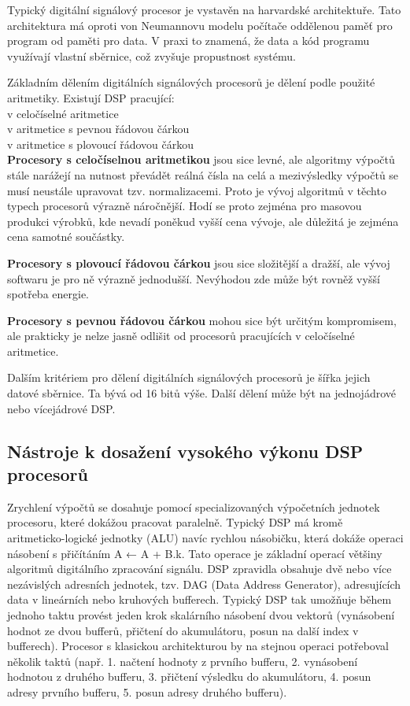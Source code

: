  Typický digitální signálový procesor je vystavěn na harvardské architektuře. Tato architektura má oproti von Neumannovu modelu počítače oddělenou paměť pro program od paměti pro data. V praxi to znamená, že data a kód programu využívají vlastní sběrnice, což zvyšuje propustnost systému.
 
Základním dělením digitálních signálových procesorů je dělení podle použité aritmetiky. Existují DSP pracující:\\
v celočíselné aritmetice\\
v aritmetice s pevnou řádovou čárkou\\
v aritmetice s plovoucí řádovou čárkou\\

\textbf{Procesory s celočíselnou aritmetikou} jsou sice levné, ale algoritmy výpočtů stále narážejí na nutnost převádět reálná čísla na celá a mezivýsledky výpočtů se musí neustále upravovat tzv. normalizacemi. Proto je vývoj algoritmů v těchto typech procesorů výrazně náročnější. Hodí se proto zejména pro masovou produkci výrobků, kde nevadí poněkud vyšší cena vývoje, ale důležitá je zejména cena samotné součástky.

\textbf{Procesory s plovoucí řádovou čárkou} jsou sice složitější a dražší, ale vývoj softwaru je pro ně výrazně jednodušší. Nevýhodou zde může být rovněž vyšší spotřeba energie.

\textbf{Procesory s pevnou řádovou čárkou} mohou sice být určitým kompromisem, ale prakticky je nelze jasně odlišit od procesorů pracujících v celočíselné aritmetice.

Dalším kritériem pro dělení digitálních signálových procesorů je šířka jejich datové sběrnice. Ta bývá od 16 bitů výše. Další dělení může být na jednojádrové nebo vícejádrové DSP. 

\subsection{Nástroje k dosažení vysokého výkonu DSP procesorů}
Zrychlení výpočtů se dosahuje pomocí specializovaných výpočetních jednotek procesoru, které dokážou pracovat paralelně. Typický DSP má kromě aritmeticko-logické jednotky (ALU) navíc rychlou násobičku, která dokáže operaci násobení s přičítáním A ← A + B.k. Tato operace je základní operací většiny algoritmů digitálního zpracování signálu. DSP zpravidla obsahuje dvě nebo více nezávislých adresních jednotek, tzv. DAG (Data Address Generator), adresujících data v lineárních nebo kruhových bufferech. Typický DSP tak umožňuje během jednoho taktu provést jeden krok skalárního násobení dvou vektorů (vynásobení hodnot ze dvou bufferů, přičtení do akumulátoru, posun na další index v bufferech). Procesor s klasickou architekturou by na stejnou operaci potřeboval několik taktů (např. 1. načtení hodnoty z prvního bufferu, 2. vynásobení hodnotou z druhého bufferu, 3. přičtení výsledku do akumulátoru, 4. posun adresy prvního bufferu, 5. posun adresy druhého bufferu).

